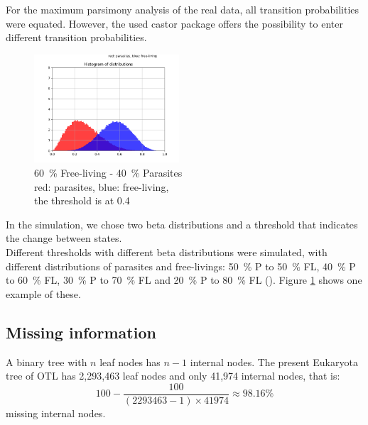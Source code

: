       For the maximum parsimony analysis of the real data, all transition probabilities were equated.
        However, the used castor package \cite{Louca2017} offers the possibility to enter different 
        transition probabilities.
      \begin{figure}
        \begin{center}
          \includegraphics[trim = 0mm 0mm 0mm 15mm, clip, width=0.48\textwidth]{Figures/40-60.png}
        \end{center}
        \caption{60~\% Free-living - 40~\% Parasites \\ red: parasites, blue: free-living, \\ the threshold is at 0.4}
        \label{fig:Beta distribution}
      \end{figure}

      In the simulation, we chose two beta distributions and a threshold that indicates the change 
        between states. \\
      Different thresholds with different beta distributions were simulated, with different distributions 
        of parasites and free-livings: 50~\% P to 50~\% FL, 40~\% P to 60~\% FL, 30~\% P to 70~\% FL and 
        20~\% P to 80~\% FL (). Figure \ref{fig:Beta distribution} 
        shows one example of these. \\

    \subsection{Missing information}

      A binary tree with $n$ leaf nodes has $n-1$ internal nodes. The present Eukaryota tree of OTL has 
        2,293,463 leaf nodes and only 41,974 internal nodes, that is:
      $$100-\frac{100}{(2293463-1) \times 41974} \approx 98.16 \%$$
        missing internal nodes. \\

